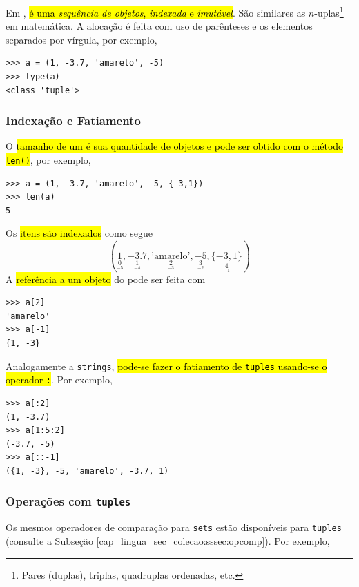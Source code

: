 Em \python, \hl{{\PYTHONtuple} é uma \emph{sequência de objetos}, \emph{indexada} e \emph{imutável}}. São similares as $n$-uplas\footnote{Pares (duplas), triplas, quadruplas ordenadas, etc.} em matemática. A alocação é feita com uso de parênteses e os elementos separados por vírgula, por exemplo,

\begin{lstlisting}
>>> a = (1, -3.7, 'amarelo', -5)
>>> type(a)
<class 'tuple'>
\end{lstlisting}

\subsubsection{Indexação e Fatiamento}

O \hl{tamanho de um {\PYTHONtuple} é sua quantidade de objetos e pode ser obtido com o método \texttt{len()}}, por exemplo,

\begin{lstlisting}
>>> a = (1, -3.7, 'amarelo', -5, {-3,1})
>>> len(a)
5
\end{lstlisting}

Os \hl{itens são indexados} como segue
\begin{equation}
  (\underset{\underset{-5}{0}}{1}, \underset{\underset{-4}{1}}{-3.7}, \underset{\underset{-3}{2}}{\text{'amarelo'}}, \underset{\underset{-2}{3}}{-5}, \underset{\underset{-1}{4}}{\{-3, 1\}})
\end{equation}
A \hl{referência a um objeto} do {\PYTHONtuple} pode ser feita com

\begin{lstlisting}
>>> a[2]
'amarelo'
>>> a[-1]
{1, -3}
\end{lstlisting}

Analogamente a \texttt{strings}, \hl{pode-se fazer o fatiamento de \texttt{tuples} usando-se o operador \texttt{:}}. Por exemplo,

\begin{lstlisting}
>>> a[:2]
(1, -3.7)
>>> a[1:5:2]
(-3.7, -5)
>>> a[::-1]
({1, -3}, -5, 'amarelo', -3.7, 1)
\end{lstlisting}

\subsubsection{Operações com \texttt{tuples}}

Os mesmos operadores de comparação para \texttt{sets} estão disponíveis para \texttt{tuples} (consulte a Subseção \ref{cap_lingua_sec_colecao:sssec:opcomp}). Por exemplo,

